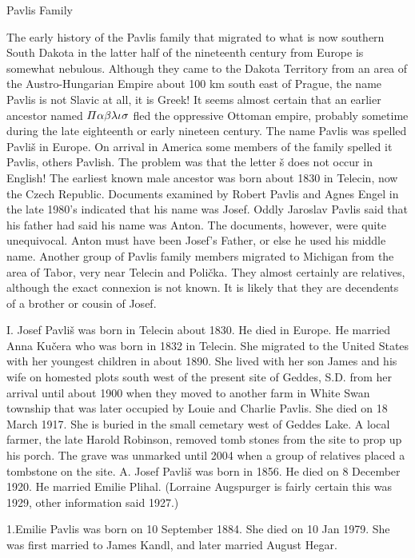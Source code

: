 \documentclass[a4paper]{article}
\begin{document}
{\Huge \noindent Pavlis Family}
\vskip 5mm

	The early history of the Pavlis family that migrated to what is now southern South Dakota in the latter half of the nineteenth century from Europe is somewhat nebulous.  Although they came to the Dakota Territory from an area of the Austro-Hungarian Empire about 100 km south east of Prague, the name Pavlis is not Slavic at all, it is Greek!   It seems almost certain that an earlier ancestor named $\mathnormal{\Pi\alpha\beta\lambda\iota\sigma}$ fled the oppressive Ottoman empire, probably sometime during the late eighteenth or early nineteen century.  
	The name Pavlis was spelled Pavli\v{s} in Europe.  On arrival in America some members of the family spelled it Pavlis, others Pavlish.  The problem was that the letter \v{s} does not occur in English!    
	The earliest known male ancestor was born about 1830 in Telecin, now the Czech Republic.  Documents examined by Robert Pavlis and Agnes Engel in the late 1980's indicated that his name was Josef.  Oddly Jaroslav Pavlis said that his father had said his name was Anton.  The documents, however,  were quite unequivocal.  Anton must have been Josef's Father, or else he used his middle name.  
	Another group of Pavlis family members migrated to Michigan from the area of Tabor, very near Telecin and Poli\v{c}ka.  They almost certainly are relatives, although the exact connexion is not known.  It is likely that they are decendents of a brother or cousin of Josef. 

I. Josef Pavli\v{s} was born in Telecin about 1830.  He died in Europe.  He married Anna Ku\v{c}era who was born in 1832 in Telecin.  She migrated to the United States with her youngest children in about 1890.  She lived with her son James and his wife on homested plots south west of the present site of Geddes, S.D.  from her arrival until about 1900 when they moved to another farm in White Swan township that was later occupied by Louie and Charlie Pavlis.  She died on 18 March 1917.  She is buried in the small cemetary west of Geddes Lake.  A local farmer, the late Harold Robinson, removed tomb stones from the site to prop up his porch.  The grave was unmarked until 2004 when a group of relatives placed a tombstone on the site.   
\vskip 6mm
A. Josef Pavli\v{s} was born in 1856.  He died on 8 December 1920.  He married Emilie Plihal. (Lorraine Augspurger is fairly certain this was 1929, other information said 1927.)

1.Emilie Pavlis was born on 10 September 1884.  She died on 10 Jan 1979.  She was first married to James Kandl, and later married August Hegar.
\end{document}
